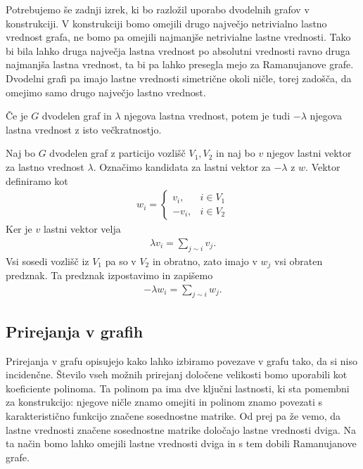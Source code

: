 Potrebujemo še zadnji izrek, ki bo razložil uporabo dvodelnih grafov v konstrukciji. V konstrukciji bomo omejili drugo največjo netrivialno lastno vrednost grafa, ne bomo pa omejili najmanjše netrivialne lastne vrednosti. Tako bi bila lahko druga največja lastna vrednost po absolutni vrednosti ravno druga najmanjša lastna vrednost, ta bi pa lahko presegla mejo za Ramanujanove grafe. Dvodelni grafi pa imajo lastne vrednosti simetrične okoli ničle, torej zadošča, da omejimo samo drugo največjo lastno vrednost\cite{godsil}.

\begin{izrek}
    Če je \(G\) dvodelen graf in \(\lambda\) njegova lastna vrednost, potem je tudi \(-\lambda\) njegova lastna vrednost z isto večkratnostjo.
\end{izrek}
\begin{dokaz}
    Naj bo \(G\) dvodelen graf z particijo vozlišč \(V_1, V_2\) in naj bo \(v\) njegov lastni vektor za lastno vrednost \(\lambda\). Označimo kandidata za lastni vektor za \(-\lambda\) z \(w\). Vektor definiramo kot
    \begin{align*}
        w_i = \begin{cases}
                  v_i,  & i\in V_1 \\
                  -v_i, & i\in V_2
              \end{cases}
    \end{align*}
    Ker je \(v\) lastni vektor velja
    \begin{align*}
        \lambda v_i = \sum_{j\sim i} v_j.
    \end{align*}
    Vsi sosedi vozlišč iz \(V_1\) pa so v \(V_2\) in obratno, zato imajo v \(w_j\) vsi obraten predznak. Ta predznak izpostavimo in zapišemo
    \begin{align*}
        -\lambda w_i = \sum_{j\sim i} w_j.
    \end{align*}
\end{dokaz}

\subsection{Prirejanja v grafih}
Prirejanja v grafu opisujejo kako lahko izbiramo povezave v grafu tako, da si niso incidenčne. Število vseh možnih prirejanj določene velikosti bomo uporabili kot koeficiente polinoma. Ta polinom pa ima dve ključni lastnosti, ki sta pomembni za konstrukcijo: njegove ničle znamo omejiti in polinom znamo povezati s karakteristično funkcijo značene sosednostne matrike. Od prej pa že vemo, da lastne vrednosti značene sosednostne matrike določajo lastne vrednosti dviga. Na ta način bomo lahko omejili lastne vrednosti dviga in s tem dobili Ramanujanove grafe.

